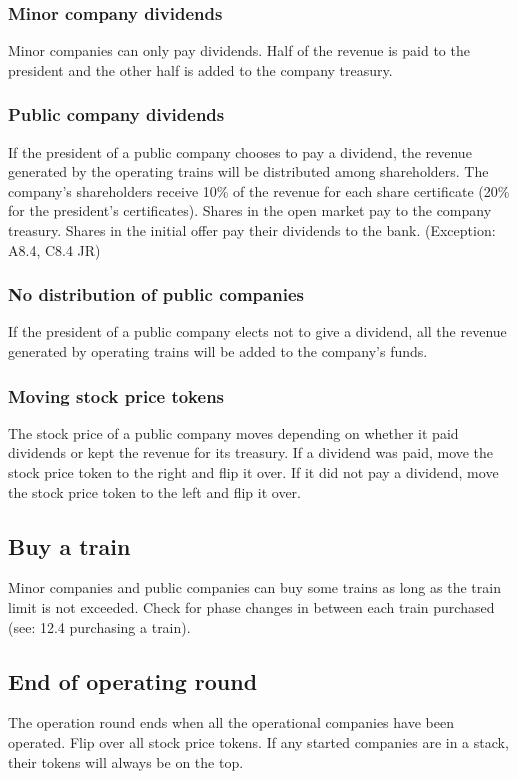 \documentclass{article}
\begin{document}
\begin{CJK}{UTF8}{min}
\begin{multicols}{2}
\subsubsection{Minor company dividends}
Minor companies can only pay dividends. Half of the revenue is paid to
the president and the other half is added to the company treasury.

\subsubsection{Public company dividends}
If the president of a public company chooses to pay a dividend, the
revenue generated by the operating trains will be distributed among
shareholders. The company's shareholders receive 10\% of the revenue
for each share certificate (20\% for the president's
certificates). Shares in the open market pay to the company
treasury. Shares in the initial offer pay their dividends to the
bank. (Exception: A8.4, C8.4 JR)

\subsubsection{No distribution of public companies}
If the president of a public company elects not to give a dividend,
all the revenue generated by operating trains will be added to the
company's funds.

\subsubsection{Moving stock price tokens}
The stock price of a public company moves depending on whether it paid
dividends or kept the revenue for its treasury. If a dividend was
paid, move the stock price token to the right and flip it over. If it
did not pay a dividend, move the stock price token to the left and
flip it over.

\subsection{Buy a train}
Minor companies and public companies can buy some trains as long as
the train limit is not exceeded. Check for phase changes in between
each train purchased (see: 12.4 purchasing a train).

\subsection{End of operating round}
The operation round ends when all the operational companies have been
operated. Flip over all stock price tokens. If any started companies
are in a stack, their tokens will always be on the top.


\end{multicols}
\end{CJK}
\end{document}
